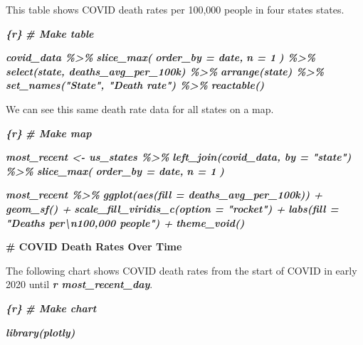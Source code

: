 \documentclass[
]{book}
\newenvironment{Shaded}{\begin{snugshade}}{\end{snugshade}}
\newcommand{\FunctionTok}[1]{\textcolor[rgb]{0.13,0.29,0.53}{\textbf{#1}}}
\newcommand{\InformationTok}[1]{\textcolor[rgb]{0.56,0.35,0.01}{\textbf{\textit{#1}}}}
\newcommand{\NormalTok}[1]{#1}
\begin{document}
\begin{Shaded}
\begin{Highlighting}[]
\NormalTok{This table shows COVID death rates per 100,000 people in four states states.}

\InformationTok{\textasciigrave{}\textasciigrave{}\textasciigrave{}\{r\}}
\InformationTok{\# Make table}

\InformationTok{covid\_data \%\textgreater{}\%}
\InformationTok{  slice\_max(}
\InformationTok{    order\_by = date,}
\InformationTok{    n = 1}
\InformationTok{  ) \%\textgreater{}\%}
\InformationTok{  select(state, deaths\_avg\_per\_100k) \%\textgreater{}\%}
\InformationTok{  arrange(state) \%\textgreater{}\%}
\InformationTok{  set\_names("State", "Death rate") \%\textgreater{}\%}
\InformationTok{  reactable()}
\InformationTok{\textasciigrave{}\textasciigrave{}\textasciigrave{}}

\NormalTok{We can see this same death rate data for all states on a map.}

\InformationTok{\textasciigrave{}\textasciigrave{}\textasciigrave{}\{r\}}
\InformationTok{\# Make map}

\InformationTok{most\_recent \textless{}{-} us\_states \%\textgreater{}\%}
\InformationTok{  left\_join(covid\_data, by = "state") \%\textgreater{}\%}
\InformationTok{  slice\_max(}
\InformationTok{    order\_by = date,}
\InformationTok{    n = 1}
\InformationTok{  )}

\InformationTok{most\_recent \%\textgreater{}\%}
\InformationTok{  ggplot(aes(fill = deaths\_avg\_per\_100k)) +}
\InformationTok{  geom\_sf() +}
\InformationTok{  scale\_fill\_viridis\_c(option = "rocket") +}
\InformationTok{  labs(fill = "Deaths per\textbackslash{}n100,000 people") +}
\InformationTok{  theme\_void()}
\InformationTok{\textasciigrave{}\textasciigrave{}\textasciigrave{}}

\FunctionTok{\# COVID Death Rates Over Time}

\NormalTok{The following chart shows COVID death rates from the start of COVID in early 2020 until }\InformationTok{\textasciigrave{}r most\_recent\_day\textasciigrave{}}\NormalTok{.}

\InformationTok{\textasciigrave{}\textasciigrave{}\textasciigrave{}\{r\}}
\InformationTok{\# Make chart}

\InformationTok{library(plotly)}


\end{Highlighting}
\end{Shaded}
\end{document}
